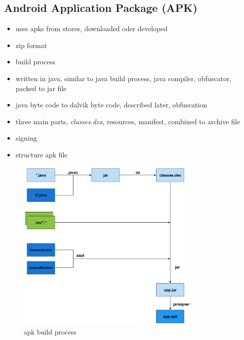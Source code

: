 \subsection{Android Application Package (APK)} \label{subsection:foundation-android-package}
\begin{itemize}
  \item uses apks from stores, downloaded oder developed
  \item zip format
  \item build process
  \item written in java, similar to java build  process, java compiler, obfuscator, packed to jar file
  \item java byte code to dalvik byte code, described later, obfuscation
  \item three main parts, \textit{classes.dex}, resources, manifest, combined to archive file
  \item signing
  \item structure apk file
\end{itemize}

\begin{figure}[h]
    \centering
    \includegraphics[width=0.8\textwidth]{data/apk.png}
    \caption{\gls{apk} build process \cite{andevconDalvikART}}
    \label{fig:apk}
\end{figure}
